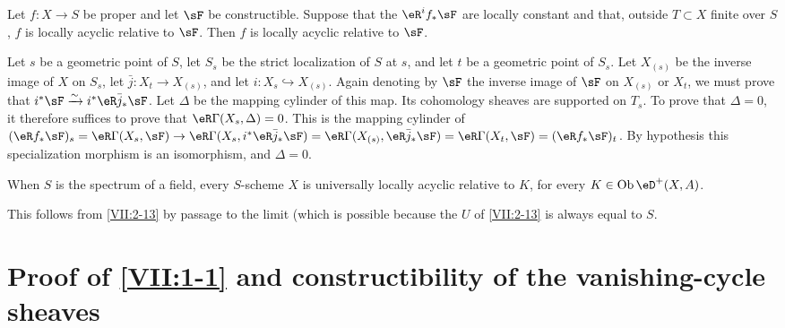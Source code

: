 \begin{lemma_}\label{VII:2-15}
Let $f:X\to S$ be proper and let $\sF$ be constructible. Suppose that the
$\eR^i f_\ast \sF$ are locally constant and that, outside $T\subset X$ finite
over $S$, $f$ is locally acyclic relative to $\sF$. Then $f$ is locally
acyclic relative to $\sF$.
\end{lemma_}

Let $s$ be a geometric point of $S$, let $S_s$ be the strict localization of
$S$ at $s$, and let $t$ be a geometric point of $S_s$. Let $X_{(s)}$ be the
inverse image of $X$ on $S_s$, let $\bar j:X_t \to X_{(s)}$, and let
$i:X_s \hookrightarrow X_{(s)}$. Again denoting by $\sF$ the inverse image of
$\sF$ on $X_{(s)}$ or $X_t$, we must prove that
$i^\ast \sF \iso i^\ast \eR \bar j_\ast \sF$. Let $\Delta$ be the mapping
cylinder of this map. Its cohomology sheaves are supported on $T_s$. To prove
that $\Delta=0$, it therefore suffices to prove that
$\eR\Gamma(X_s,\Delta)=0$. This is the mapping cylinder of
$(\eR f_\ast \sF)_s = \eR\Gamma(X_s,\sF) \to \eR\Gamma(X_s,i^\ast \eR\bar j_\ast \sF) = \eR\Gamma(X_{(s)},\eR\bar j_\ast \sF) = \eR\Gamma(X_t,\sF) = (\eR f_\ast \sF)_t$.
By hypothesis this specialization morphism is an isomorphism, and
$\Delta=0$.





\begin{corollary_}\label{VII:2-16}
When $S$ is the spectrum of a field, every $S$-scheme $X$ is universally
locally acyclic relative to $K$, for every $K\in\ob\eD^+(X,A)$.
\end{corollary_}

This follows from \ref{VII:2-13} by passage to the limit (which is possible
because the $U$ of \ref{VII:2-13} is always equal to $S$.








\section{Proof of \texorpdfstring{\ref{VII:1-1}}{1.1} and constructibility of the vanishing-cycle sheaves}\label{VII:3}






\subsection{}\label{VII:3-1}

